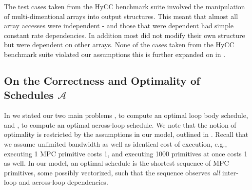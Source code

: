 The test cases taken from the HyCC benchmark suite involved the manipulation of multi-dimentional arrays into output structures. 
This meant that almost all array accesses were independent - and those
that were dependent had simple constant rate dependencies. In addition most did not modify their own structure but were dependent 
on other arrays. None of the cases taken from the HyCC benchmark suite violated our assumptions 
this is further expanded on in . 





\subsection{On the Correctness and Optimality of Schedules $\mathcal{A}$}
\label{sec:theoreticalguarentees}

In  we stated our two main problems , to compute an optimal loop body schedule, 
and , to compute an optimal across-loop schedule. We note that the notion of optimality is restricted by the assumptions in
our model, outlined in . Recall that we assume unlimited bandwidth as well as identical cost of execution, e.g.,
executing 1 MPC primitive costs 1, and executing 1000 primitives at once costs 1 as well. In our model, an optimal schedule is the shortest 
sequence of MPC primitives, some possibly vectorized, such that the sequence observes \emph{all} inter-loop and across-loop dependencies. 

